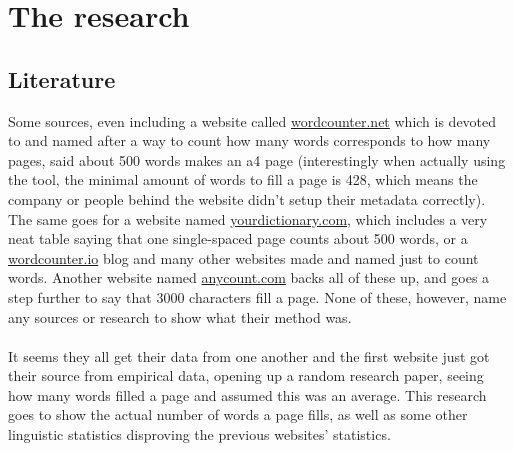 \documentclass[9pt, a4paper]{article}
\begin{document}
\newpage
\section{The research}


\subsection{Literature}
\label{sec:literature}
Some sources, even including a website called \href{https://wordcounter.net/words-per-page}{wordcounter.net} which is devoted to and named after a way to count how many words corresponds to how many pages, said about 500 words makes an a4 page (interestingly when actually using the tool, the minimal amount of words to fill a page is 428, which means the company or people behind the website didn't setup their metadata correctly). The same goes for a website named \href{https://grammar.yourdictionary.com/grammar/writing/how-many-pages-is-1000-words.html}{yourdictionary.com}, which includes a very neat table saying that one single-spaced page counts about 500 words, or a \href{https://wordcounter.io/blog/how-many-words-per-page/}{wordcounter.io} blog and many other websites made and named just to count words. Another website named \href{https://www.anycount.com/word-count-news/how-many-words-in-one-page/}{anycount.com} backs all of these up, and goes a step further to say that 3000 characters fill a page. None of these, however, name any sources or research to show what their method was.\\
\\
It seems they all get their data from one another and the first website just got their source from empirical data, opening up a random research paper, seeing how many words filled a page and assumed this was an average. This research goes to show the actual number of words a page fills, as well as some other linguistic statistics disproving the previous websites' statistics.
\end{document}
